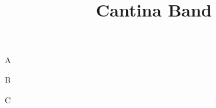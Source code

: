 \documentclass[timestamp]{jazzgrid}
\title{Cantina Band}
\begin{document}
\maketitle
\begin{musicsection}{A}
\barline
	{\barfour{}
		{}
		{}
		{}
		{}
	}
	{\barfour{}
		{}
		{}
		{}
		{}
	}
	{\barfour{}
		{}
		{}
		{}
		{}
	}
	{\barfour{}
		{}
		{}
		{}
		{}
	}
\barline
	{\barfour{}
		{}
		{}
		{}
		{}
	}
	{\barfour{}
		{}
		{}
		{}
		{}
	}
	{\barfour{}
		{}
		{}
		{}
		{}
	}
	{\barfour{}
		{}
		{}
		{}
		{}
	}
\barline
	{\barfour{}
		{}
		{}
		{}
		{}
	}
	{\barfour{}
		{}
		{}
		{}
		{}
	}
	{\barfour{}
		{}
		{}
		{}
		{}
	}
	{\barfour{}
		{}
		{}
		{}
		{}
	}
\barline
	{\barfour{}
		{}
		{}
		{}
		{}
	}
	{\barfour{}
		{}
		{}
		{}
		{}
	}
	{\barfour{}
		{}
		{}
		{}
		{}
	}
	{\barfour{}
		{}
		{}
		{}
		{}
	}
\end{musicsection}

\begin{musicsection}{B}
\barline
	{\barfour{}
		{}
		{}
		{}
		{}
	}
	{\barfour{}
		{}
		{}
		{}
		{}
	}
	{\barfour{}
		{}
		{}
		{}
		{}
	}
	{\barfour{}
		{}
		{}
		{}
		{}
	}
\barline
	{\barfour{}
		{}
		{}
		{}
		{}
	}
	{\barfour{}
		{}
		{}
		{}
		{}
	}
	{\barfour{}
		{}
		{}
		{}
		{}
	}
	{\barfour{}
		{}
		{}
		{}
		{}
	}
\barline
	{\barfour{}
		{}
		{}
		{}
		{}
	}
	{\barfour{}
		{}
		{}
		{}
		{}
	}
	{\barfour{}
		{}
		{}
		{}
		{}
	}
	{\barfour{}
		{}
		{}
		{}
		{}
	}
\barline
	{\barfour{}
		{}
		{}
		{}
		{}
	}
	{\barfour{}
		{}
		{}
		{}
		{}
	}
	{\barfour{}
		{}
		{}
		{}
		{}
	}
	{\barfour{}
		{}
		{}
		{}
		{}
	}
\end{musicsection}
\begin{musicsection}{C}
\barline
	{\barfour{}
		{}
		{}
		{}
		{}
	}
	{\barfour{}
		{}
		{}
		{}
		{}
	}
	{\barfour{}
		{}
		{}
		{}
		{}
	}
	{\barfour{}
		{}
		{}
		{}
		{}
	}
\barline
	{\barfour{}
		{}
		{}
		{}
		{}
	}
	{\barfour{}
		{}
		{}
		{}
		{}
	}
	{\barfour{}
		{}
		{}
		{}
		{}
	}
	{\barfour{}
		{}
		{}
		{}
		{}
	}
\end{musicsection}
\end{document}

